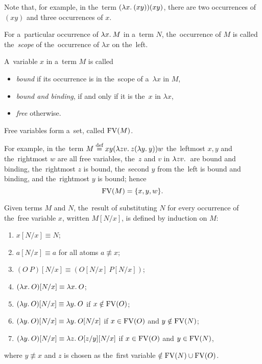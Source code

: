 Note that, for example, in the~term $(\lambda x . \: ( x y)) (x y)$, there are two
occurrences of $(x y)$ and three occurrences of $x$.

\begin{definition}
  For a~particular occurrence of $\lambda x . \: M$ in a~term $N$, the~occurrence of $M$
  is called the~\emph{scope} of the~occurrence of $\lambda x$ on the~left.
\end{definition}

\begin{definition}
  A~variable $x$ in a~term $M$ is called
  \begin{itemize}
    \item \emph{bound} if its occurrence is in the~scope of a~$\lambda x$ in
      $M$,
    \item \emph{bound and binding}, if and only if it is the~$x$ in $\lambda x$,
    \item \emph{free} otherwise.
  \end{itemize}
  Free variables form a~set, called $\mathrm{FV}(M)$.
\end{definition}

For example, in the~term $M \overset{\textrm{def}}{=} xy(\lambda zv . \: z (\lambda y . \: y))w$ the~leftmost
$x, y$ and the~rightmost $w$ are all free variables, the~$z$ and $v$ in
$\lambda zv . \: $ are bound and binding, the~rightmost $z$ is bound, the~second $y$
from the~left is bound and binding, and the~rightmost $y$ is bound;
hence
\[
  \mathrm{FV}(M) = \{x, y, w\} .
\]

\begin{definition}[Substitution]\label{def:substitution}
  Given terms $M$ and $N$, the~result of substituting $N$ for every occurrence
  of the~free variable $x$, written $M[N/x]$, is defined by induction on $M$:
  \begin{enumerate}
    \item $x[N/x]  \equiv N$;
    \item $a[N/x]  \equiv a$  \hfill for all atoms $a \not\equiv x$;
    \item $(O \: P)[N/x]  \equiv (O[N/x] \: P[N/x])$;
    \item $(\lambda x . \: O)[N/x]  \equiv \lambda x . \: O$;
    \item $(\lambda y . \: O)[N/x]  \equiv \lambda y . \: O$ \hfill if $x \notin \mathrm{FV}(O)$;
    \item $(\lambda y . \: O)[N/x]  \equiv \lambda y . \: O[N/x]$
      \hfill if $x \in \mathrm{FV}(O)$ and $y \notin \mathrm{FV}(N)$;
    \item \label{def:substitution:g_item} $(\lambda y . \: O)[N/x]
      \equiv \lambda z . \: O[z/y][N/x]$ \hfill if $x \in \mathrm{FV}(O)$ and $y \in \mathrm{FV}(N)$,
  \end{enumerate}
  where $y \not\equiv x$ and $z$ is chosen as the~first variable $\notin \mathrm{FV}(N)
  \cup \mathrm{FV}(O)$.
\end{definition}

